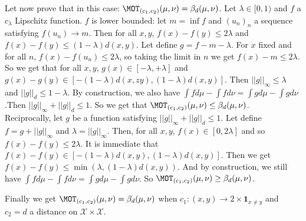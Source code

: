 \begin{prv*}
Let now prove that in this case: $\MOT_{(c_1,c_2)}(\mu,\nu) = \beta_d(\mu,\nu)$. Let $\lambda \in [0,1)$ and $f$ a $c_\lambda$ Lipschitz function. $f$ is lower bounded: let $m = \inf f$ and $(u_n)_n$ a sequence satisfying $f(u_n)\rightarrow m$. Then for all $x,y$, $f(x)-f(y)\leq2\lambda$ and  $f(x)-f(y)\leq(1-\lambda)d(x,y)$. Let define $g=f-m-\lambda$. For $x$ fixed and for all $n$,  $f(x)-f(u_n)\leq2\lambda$, so taking the limit in $n$ we get $f(x)-m\leq2\lambda$.  So we get that for all $x,y$, $g(x)\in[-\lambda,+\lambda]$ and $g(x)-g(y)\in[-(1-\lambda)d(x,zy),(1-\lambda)d(x,y)]$. Then $||g||_\infty\leq \lambda$ and $||g||_d\leq 1-\lambda$. By construction, we also have $\int fd\mu-\int fd\nu=\int gd\mu-\int gd\nu$.Then $||g||_\infty+||g||_d\leq 1$. So we get that $\MOT_{(c_1,c_2)}(\mu,\nu) \leq \beta_d(\mu,\nu)$.\\
Reciprocally, let $g$ be a function satisfying $||g||_\infty+||g||_d\leq 1$. Let define $f=g+||g||_\infty$ and $\lambda = ||g||_\infty$. Then, for all $x,y$, $f(x)\in[0,2\lambda]$ and so $f(x)-f(y)\leq 2\lambda$. It is immediate that $f(x)-f(y)\in[-(1-\lambda)d(x,y),(1-\lambda)d(x,y)]$. Then we get $f(x)-f(y)\leq \min(\lambda,(1-\lambda)d(x,y))$. And by construction, we still have $\int fd\mu-\int fd\nu=\int gd\mu-\int gd\nu$. So $\MOT_{(c_1,c_2)}(\mu,\nu) \geq \beta_d(\mu,\nu)$.

\medskip

Finally we get $\MOT_{(c_1,c_2)}(\mu,\nu) = \beta_d(\mu,\nu)$ when $c_1:(x,y)\rightarrow2\times \mathbf{1}_{x\neq y}$ and $c_2=d$ a distance on $\mathcal{X}\times\mathcal{X}$.
\end{prv*}



